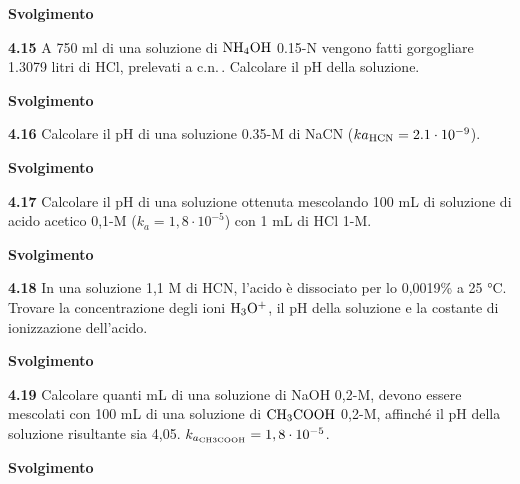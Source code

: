 \vspace{0.2cm}\large\textbf{Svolgimento}\normalsize

\vspace{0.2cm}

\vspace{0.2cm}\textbf{4.15} A 750 ml di una soluzione di $\rm NH_4OH$ 0.15-N vengono fatti gorgogliare 1.3079 litri di HCl, prelevati a c.n.\,. Calcolare il pH della soluzione.

\vspace{0.2cm}\large\textbf{Svolgimento}\normalsize

\vspace{0.2cm}

\vspace{0.2cm}\textbf{4.16} Calcolare il pH di una soluzione 0.35-M di NaCN ($k{a_{\rm HCN}} = 2.1 \cdot 10^{-9}$).

\vspace{0.2cm}\large\textbf{Svolgimento}\normalsize

\vspace{0.2cm}

\vspace{0.2cm}\textbf{4.17} Calcolare il pH di una soluzione ottenuta mescolando 100 mL di soluzione di acido acetico 0,1-M ($k_a = 1,8 \cdot 10^{-5}$) con 1 mL di HCl 1-M.

\vspace{0.2cm}\large\textbf{Svolgimento}\normalsize

\vspace{0.2cm}

\vspace{0.2cm}\textbf{4.18}  In una soluzione 1,1 M di HCN, l’acido è dissociato per lo 0,0019\% a 25 °C. Trovare la concentrazione degli ioni $\rm H_3O^+$, il pH della soluzione e la costante di ionizzazione dell’acido. 

\vspace{0.2cm}\large\textbf{Svolgimento}\normalsize

\vspace{0.2cm}

\vspace{0.2cm}\textbf{4.19}  Calcolare quanti mL di una soluzione di NaOH 0,2-M, devono essere mescolati con
100 mL di una soluzione di $\rm CH_3COOH$ 0,2-M, affinché il pH della soluzione risultante sia 4,05. $k_{a_{\rm CH3COOH}}= 1,8 \cdot 10^{-5}$.

\vspace{0.2cm}\large\textbf{Svolgimento}\normalsize

